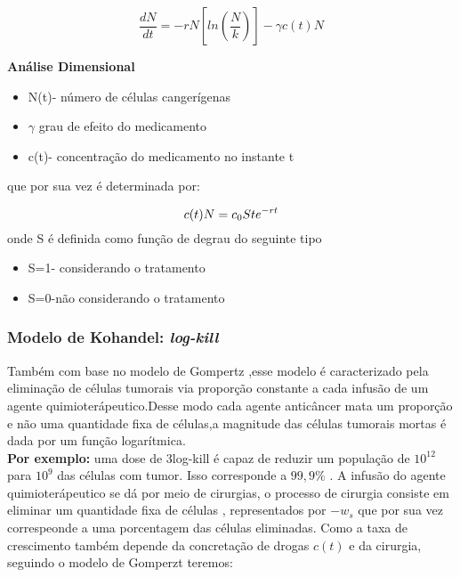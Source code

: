 \begin{equation}
  \frac{dN}{dt}= -rN[ln(\frac{N}{k})]-\gamma c(t)N
\end{equation}


\textbf{Análise Dimensional}

\begin{itemize}

    \item N(t)- número de células cangerígenas
    \item $\gamma$ grau de efeito do medicamento 
    \item c(t)- concentração do medicamento no instante t
\end{itemize}

que por sua vez é determinada por:

\begin{equation*}
    c(t)N=c_0Ste^{-rt}  \\
\end{equation*}
onde S é definida como  função de degrau do seguinte tipo 
\begin{itemize}

    \item S=1- considerando o tratamento
    \item S=0-não considerando o tratamento
\end{itemize}

\newpage
\subsubsection{Modelo de Kohandel: \textit{log-kill}}

Também com base no modelo de Gompertz ,esse modelo é caracterizado pela eliminação de células tumorais via proporção constante a cada infusão de um agente quimioterápeutico.Desse modo cada agente anticâncer mata um proporção e não uma quantidade fixa de células,a magnitude das células tumorais mortas é dada por um função logarítmica.\\
\textbf{Por exemplo:} uma dose de 3log-kill é capaz de reduzir um população de $10^12$ para $10^9$ das células com tumor. Isso corresponde a $99,9\%$ .
A infusão do agente quimioterápeutico se dá por meio de cirurgias, o processo de cirurgia consiste em eliminar um quantidade fixa de células , representados por $-w_s$ que por sua vez correspeonde  a uma porcentagem das células eliminadas.
Como a taxa de crescimento também depende da concretação de drogas $c(t)$ e da cirurgia, seguindo o modelo de Gomperzt teremos:

